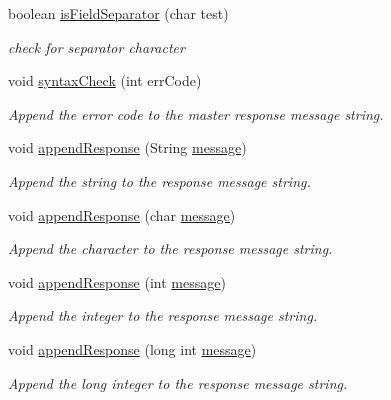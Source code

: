 \begin{DoxyCompactItemize}
boolean \hyperlink{_meditech___chip_kit_control_panel_8pde_a5e204e0bba8ab8ee2bde88215bf2ee53}{is\-Field\-Separator} (char test)
\begin{DoxyCompactList}\small\item\em check for separator character \end{DoxyCompactList}\item 
void \hyperlink{_meditech___chip_kit_control_panel_8pde_a586164a6eff90eab6ba87a6ca123770d}{syntax\-Check} (int err\-Code)
\begin{DoxyCompactList}\small\item\em Append the error code to the master response message string. \end{DoxyCompactList}\item 
void \hyperlink{_meditech___chip_kit_control_panel_8pde_afffcc2cca703b7a4d76c7f2dedd7266d}{append\-Response} (String \hyperlink{_meditech___chip_kit_control_panel_8pde_ae1956b5b6310b3339e72931911b84e3f}{message})
\begin{DoxyCompactList}\small\item\em Append the string to the response message string. \end{DoxyCompactList}\item 
void \hyperlink{_meditech___chip_kit_control_panel_8pde_ab4a96ab750b61d7410c41283cf17bac5}{append\-Response} (char \hyperlink{_meditech___chip_kit_control_panel_8pde_ae1956b5b6310b3339e72931911b84e3f}{message})
\begin{DoxyCompactList}\small\item\em Append the character to the response message string. \end{DoxyCompactList}\item 
void \hyperlink{_meditech___chip_kit_control_panel_8pde_a4d7e4234d7256ea1f3cca5fd420c84da}{append\-Response} (int \hyperlink{_meditech___chip_kit_control_panel_8pde_ae1956b5b6310b3339e72931911b84e3f}{message})
\begin{DoxyCompactList}\small\item\em Append the integer to the response message string. \end{DoxyCompactList}\item 
void \hyperlink{_meditech___chip_kit_control_panel_8pde_a26e2576348920e813fa803510e0a6d24}{append\-Response} (long int \hyperlink{_meditech___chip_kit_control_panel_8pde_ae1956b5b6310b3339e72931911b84e3f}{message})
\begin{DoxyCompactList}\small\item\em Append the long integer to the response message string. \end{DoxyCompactList}\item 

\end{DoxyCompactItemize}
